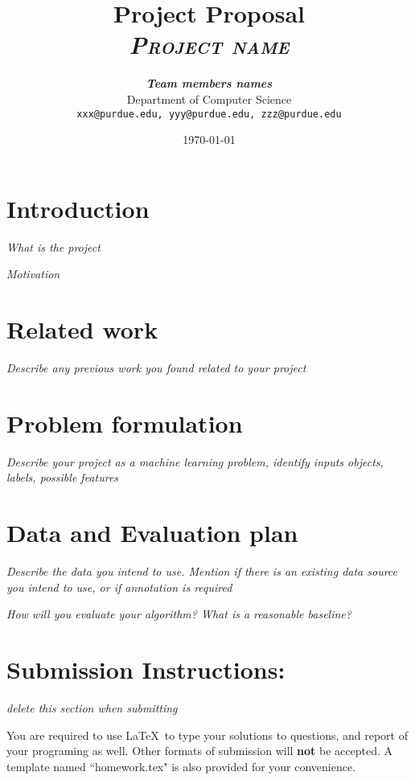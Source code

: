 \documentclass[11pt]{article}
\title{
\textbf{Project Proposal} \\ \textsc{\textit{Project name}} \\
}
\author{
	\textbf{\textit{Team members names}} \\
	Department of Computer Science\\
	\texttt{xxx@purdue.edu, yyy@purdue.edu, zzz@purdue.edu}
}
\date{\today}
\begin{document}
\maketitle


\section{Introduction}
\textit{What is the project}

\textit{Motivation}

\section{Related work}
\textit{Describe any previous work you found related to your project}

\section{Problem formulation}
\textit{Describe your project as a machine learning problem, identify inputs objects, labels, possible features}

\section{Data and Evaluation plan}
\textit{Describe the data you intend to use. Mention if there is an existing data source you intend to use, or if annotation is required}

\textit{How will you evaluate your algorithm? What is a reasonable baseline?}



\section*{Submission Instructions:} 
\textit{delete this section when submitting}

You are required to use \LaTeX \, to type your solutions to questions, and report of your programing as well. Other formats of submission will \textbf{not} be accepted. A template named ``homework.tex" is also provided for your convenience.\\
\end{document}
